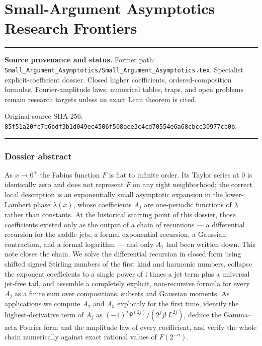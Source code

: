 \documentclass[11pt,oneside]{article}
\theoremstyle{definition}
\theoremstyle{remark}
\newcommand{\ii}{\mathrm i}
\newenvironment{boxedremark}{%
  \par\smallskip\noindent\begin{center}\begin{minipage}{0.94\textwidth}%
  \color{black}\hrule\vspace{0.6em}\small
}{%
  \vspace{0.6em}\hrule\end{minipage}\end{center}\smallskip
}
\begin{document}
\renewcommand{\arraystretch}{1}


\clearpage
\part{Small-Argument Asymptotics Research Frontiers}
\label{part:smallarg}
\begin{boxedremark}
\textbf{Source provenance and status.} Former path: \nolinkurl{Small_Argument_Asymptotics/Small_Argument_Asymptotics.tex}.  Specialist explicit-coefficient dossier.  Closed higher coefficients, ordered-composition formulas, Fourier-amplitude laws, numerical tables, traps, and open problems remain research targets unless an exact Lean theorem is cited.\par\smallskip Original source SHA-256: \nolinkurl{85f51a20fc7b6bdf3b1d049ec4506f508aee3c4cd70554e6a68cbcc30977cb0b}.
\end{boxedremark}
\section*{Dossier abstract}
As $x\to0^+$ the Fabius function $F$ is flat to infinite order.  Its Taylor
series at \(0\) is identically zero and does not represent \(F\) on any right
neighborhood; the correct local description is an exponentially small
asymptotic expansion in the lower-Lambert phase $\lambda(x)$, whose
coefficients $A_j$ are one-periodic functions of $\lambda$ rather than
constants.  At the historical starting point of this dossier, those coefficients existed
only as the output of a chain
of recursions --- a differential recursion for the saddle jets, a formal
exponential recursion, a Gaussian contraction, and a formal logarithm --- and
only $A_1$ had been written down.  This note closes the chain.  We solve
the differential recursion in closed form using shifted signed Stirling numbers
of the first kind and harmonic numbers, collapse the exponent coefficients to a single
power of $\ii$ times a jet term plus a universal jet-free tail, and assemble a
completely explicit, non-recursive formula for every $A_j$ as a finite sum over
compositions, subsets and Gaussian moments.  As applications we compute $A_2$
and $A_3$ explicitly for the first time, identify the highest-derivative term
of $A_j$ as $(-1)^j\Psi^{(2j)}/(2^jj!\,L^{2j})$, deduce the
Gamma--zeta Fourier form and the amplitude law of every coefficient, and verify
the whole chain numerically against exact rational values of $F(2^{-n})$.
\end{document}
